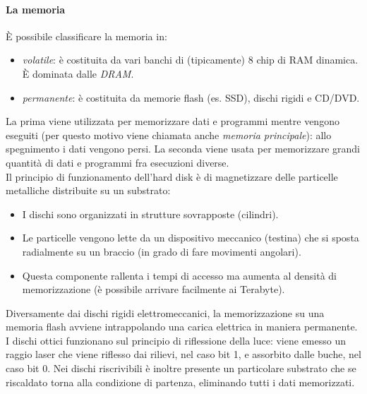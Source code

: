 \documentclass[class=book, crop=false]{standalone}
\begin{document}
\paragraph*{La memoria}
\`{E} possibile classificare la memoria in:
\begin{itemize}[noitemsep]
	\item \emph{volatile}: è costituita da vari banchi di (tipicamente) 8 chip di RAM dinamica. \`{E} dominata dalle \emph{DRAM}.
	\item \emph{permanente}: è costituita da memorie flash (es. SSD), dischi rigidi e CD/DVD.
\end{itemize}
La prima viene utilizzata per memorizzare dati e programmi mentre vengono eseguiti (per questo motivo viene chiamata anche \emph{memoria principale}): allo spegnimento i dati vengono persi. La seconda viene usata per memorizzare grandi quantità di dati e programmi fra esecuzioni diverse.\\
Il principio di funzionamento dell'hard disk è di magnetizzare delle particelle metalliche distribuite su un substrato:
\begin{itemize}[noitemsep]
	\item I dischi sono organizzati in strutture sovrapposte (cilindri).
	\item Le particelle vengono lette da un dispositivo meccanico (testina) che si sposta radialmente su un braccio (in grado di fare movimenti angolari).
	\item Questa componente rallenta i tempi di accesso ma aumenta al densità di memorizzazione (è possibile arrivare facilmente ai Terabyte).
\end{itemize}

Diversamente dai dischi rigidi elettromeccanici, la memorizzazione su una memoria flash avviene intrappolando una carica elettrica in maniera permanente.\\
I dischi ottici funzionano sul principio di riflessione della luce: viene emesso un raggio laser che viene riflesso dai rilievi, nel caso bit 1, e assorbito dalle buche, nel caso bit 0. Nei dischi riscrivibili è inoltre presente un particolare substrato che se riscaldato torna alla condizione di partenza, eliminando tutti i dati memorizzati.
\end{document}
